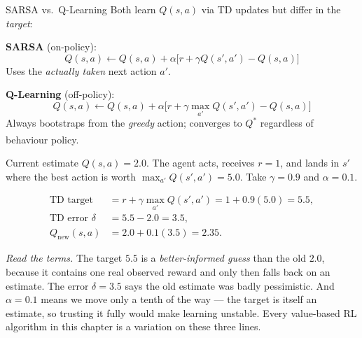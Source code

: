 \begin{v3topic}{SARSA vs.\ Q-Learning}
        Both learn $Q(s,a)$ via TD updates but differ in the \emph{target}:

        \textbf{SARSA} (on-policy):
        \begin{equation}
            Q(s,a) \leftarrow Q(s,a) + \alpha\bigl[r + \gamma Q(s',a') - Q(s,a)\bigr]
        \end{equation}
        Uses the \emph{actually taken} next action $a'$.

        \textbf{Q-Learning} (off-policy):
        \begin{equation}
            Q(s,a) \leftarrow Q(s,a) + \alpha\bigl[r + \gamma \max_{a'} Q(s',a') - Q(s,a)\bigr]
        \end{equation}
        Always bootstraps from the \emph{greedy} action; converges to
        $Q^*$ regardless of behaviour
        policy.\textsuperscript{\cite[][p.~346]{hurbansGrokkingArtificialIntelligence2020}}

\begin{workedexample}
Current estimate $Q(s,a) = 2.0$. The agent acts, receives $r = 1$, and lands in
$s'$ where the best action is worth $\max_{a'} Q(s',a') = 5.0$. Take
$\gamma = 0.9$ and $\alpha = 0.1$.

\[
\begin{aligned}
  \text{TD target} &= r + \gamma\max_{a'}Q(s',a') = 1 + 0.9(5.0) = 5.5,\\
  \text{TD error } \delta &= 5.5 - 2.0 = 3.5,\\
  Q_{\text{new}}(s,a) &= 2.0 + 0.1(3.5) = \mathbf{2.35}.
\end{aligned}
\]

\emph{Read the terms.} The target $5.5$ is a \emph{better-informed guess} than
the old $2.0$, because it contains one real observed reward and only then falls
back on an estimate. The error $\delta = 3.5$ says the old estimate was
badly pessimistic. And $\alpha = 0.1$ means we move only a tenth of the way ---
the target is itself an estimate, so trusting it fully would make learning
unstable. Every value-based RL algorithm in this chapter is a variation on
these three lines.
\end{workedexample}


\end{v3topic}
